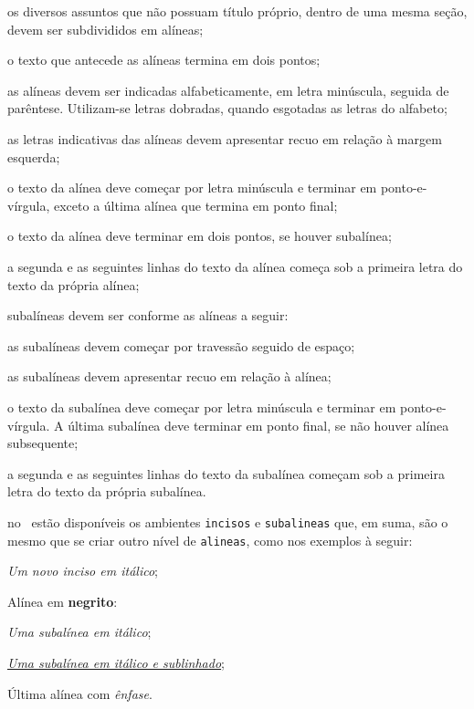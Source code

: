 \begin{alineas}

  \item os diversos assuntos que não possuam título próprio, dentro de uma mesma seção, devem ser subdivididos em alíneas; 
  \item o texto que antecede as alíneas termina em dois pontos;
  \item as alíneas devem ser indicadas alfabeticamente, em letra minúscula, seguida de parêntese. Utilizam-se letras dobradas, quando esgotadas as letras do alfabeto;
  \item as letras indicativas das alíneas devem apresentar recuo em relação à margem esquerda;
  \item o texto da alínea deve começar por letra minúscula e terminar em ponto-e-vírgula, exceto a última alínea que termina em ponto final;
  \item o texto da alínea deve terminar em dois pontos, se houver subalínea;
  \item a segunda e as seguintes linhas do texto da alínea começa sob a primeira letra do texto da própria alínea;
  \item subalíneas \cite[seção 4.3]{NBR6024:2012} devem ser conforme as alíneas a   seguir:

  \begin{alineas}
     \item as subalíneas devem começar por travessão seguido de espaço;
     \item as subalíneas devem apresentar recuo em relação à alínea;
     \item o texto da subalínea deve começar por letra minúscula e terminar em ponto-e-vírgula. A última subalínea deve terminar em ponto final, se não houver alínea subsequente;
     \item a segunda e as seguintes linhas do texto da subalínea começam sob a primeira letra do texto da própria subalínea.
  \end{alineas}
  
  \item no \abnTeX\ estão disponíveis os ambientes \texttt{incisos} e  \texttt{subalineas} que, em suma, são o mesmo que se criar outro nível de \texttt{alineas}, como nos exemplos à seguir:
  
  \begin{incisos}
    \item \textit{Um novo inciso em itálico};
  \end{incisos}
  
  \item Alínea em \textbf{negrito}:
  
  \begin{subalineas}
    \item \textit{Uma subalínea em itálico};
    \item \underline{\textit{Uma subalínea em itálico e sublinhado}}; 
  \end{subalineas}
  
  \item Última alínea com \emph{ênfase}.
  
\end{alineas}

